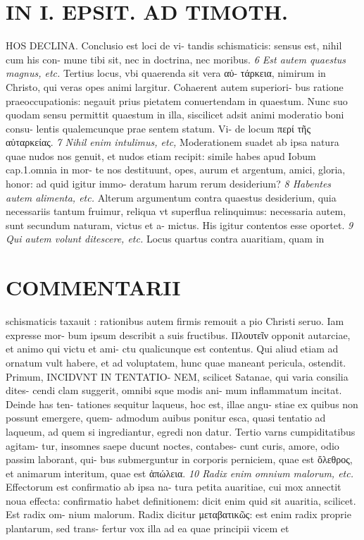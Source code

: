 \documentclass{article}
\begin{document}
\begin{pages}
\section*{IN I. EPSIT. AD TIMOTH. }
\marginpar{[ p.155 ]}\pstart HOS DECLINA. Conclusio est loci de vi- tandis schismaticis: sensus est, nihil cum his con- mune tibi sit, nec in doctrina, nec moribus.  \pend
\textit{6 Est autem quaestus magnus, etc. }\pstart Tertius locus, vbi quaerenda sit vera αὐ- τάρκεια, nimirum in Christo, qui veras opes animi largitur. Cohaerent autem superiori- bus ratione praeoccupationis: negauit prius pietatem conuertendam in quaestum. Nunc suo quodam sensu permittit quaestum in illa, siscilicet adsit animi moderatio boni consu- lentis qualemcunque prae sentem statum. Vi- de locum περί τῆς αὐταρκείας.  \pend
\textit{7 Nihil enim intulimus, etc, }\pstart Moderationem suadet ab ipsa natura quae nudos nos genuit, et nudos etiam recipit: simile habes apud Iobum cap.1.omnia in mor- te nos destituunt, opes, aurum et argentum, amici, gloria, honor: ad quid igitur immo- deratum harum rerum desiderium?  \pend
\textit{8 Habentes autem alimenta, etc. }\pstart Alterum argumentum contra quaestus desiderium, quia necessariis tantum fruimur, reliqua vt superflua relinquimus: necessaria autem, sunt secundum naturam, victus et a- mictus. His igitur contentos esse oportet.  \pend
\textit{9 Qui autem volunt ditescere, etc. }\pstart Locus quartus contra auaritiam, quam in  \pend
\marginpar{[ p.156 ]}
\section*{COMMENTARII }\pstart schismaticis taxauit : rationibus autem firmis remouit a pio Christi seruo. Iam expresse mor- bum ipsum describit a suis fructibus. Πλουτεῖν opponit autarciae, et animo qui victu et ami- ctu qualicunque est contentus. Qui aliud etiam ad ornatum vult habere, et ad voluptatem, hunc quae maneant pericula, ostendit.  \pend\pstart Primum, INCIDVNT IN TENTATIO- NEM, scilicet Satanae, qui varia consilia dites- cendi clam suggerit, omnibi sque modis ani- mum inflammatum incitat. Deinde has ten- tationes sequitur laqueus, hoc est, illae angu- stiae ex quibus non possunt emergere, quem- admodum auibus ponitur esca, quasi tentatio ad laqueum, ad quem si ingrediantur, egredi non datur. Tertio varns cumpiditatibus agitam- tur, insomnes saepe ducunt noctes, contabes- cunt curis, amore, odio passim laborant, qui- bus submerguntur in corporis perniciem, quae est ὄλεθρος, et animarum interitum, quae est ἀπώλεια.  \pend
\textit{10 Radix enim omnium malorum, etc. }\pstart Effectorum est confirmatio ab ipsa na- tura petita auaritiae, cui mox annectit noua effecta: confirmatio habet definitionem: dicit enim quid sit auaritia, scilicet. Est radix om- nium malorum. Radix dicitur μεταβατικῶς: est enim radix proprie plantarum, sed trans- fertur vox illa ad ea quae principii vicem et  \pend

\end{pages}
\end{document}
